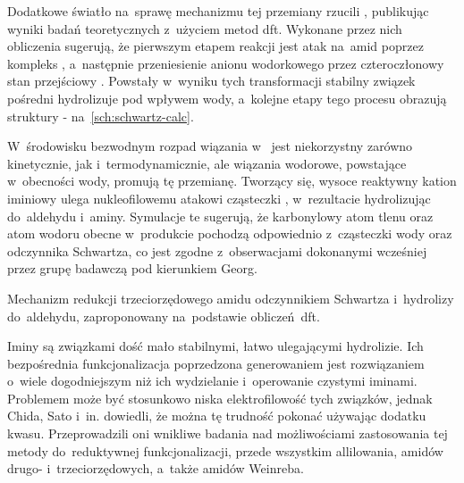 Dodatkowe światło na~sprawę mechanizmu tej przemiany rzucili \citeauthor{wang10}, publikując
  wyniki badań teoretycznych z~użyciem metod \gls{dft}.
Wykonane przez nich obliczenia sugerują, że pierwszym etapem reakcji jest atak \schwartz{}
  na~amid poprzez kompleks , a~następnie przeniesienie anionu wodorkowego
  przez czteroczłonowy stan przejściowy .
Powstały w~wyniku tych transformacji stabilny związek pośredni  hydrolizuje
  pod wpływem wody, a~kolejne etapy tego procesu obrazują struktury
  \-- na~\cref{sch:schwartz-calc}.

W~środowisku bezwodnym rozpad wiązania  w~ jest niekorzystny zarówno
  kinetycznie, jak i~termodynamicznie, ale wiązania wodorowe, powstające w~obecności wody,
  promują tę przemianę.
Tworzący się, wysoce reaktywny kation iminiowy  ulega nukleofilowemu atakowi
  cząsteczki , w~rezultacie hydrolizując do~aldehydu i~aminy.
Symulacje te sugerują, że karbonylowy atom tlenu oraz atom wodoru obecne w~produkcie pochodzą
  odpowiednio z~cząsteczki wody oraz odczynnika Schwartza, co jest zgodne z~obserwacjami dokonanymi
  wcześniej przez grupę badawczą pod kierunkiem Georg.
\begin{scheme*}
  
  \caption{
    Mechanizm redukcji trzeciorzędowego amidu odczynnikiem Schwartza i~hydrolizy do~aldehydu,
    zaproponowany na~podstawie obliczeń~\gls{dft}.
  }
  \label{sch:schwartz-calc}
\end{scheme*}

Iminy są związkami dość mało stabilnymi, łatwo ulegającymi hydrolizie.
Ich bezpośrednia funkcjonalizacja poprzedzona generowaniem \insitu{} jest rozwiązaniem
  o~wiele dogodniejszym niż ich wydzielanie i~operowanie czystymi iminami.
Problemem może być stosunkowo niska elektrofilowość tych związków, jednak Chida, Sato i~in.
  dowiedli, że można tę trudność pokonać używając dodatku kwasu.
Przeprowadzili oni wnikliwe badania nad możliwościami zastosowania tej metody do~reduktywnej
  funkcjonalizacji, przede wszystkim allilowania, amidów drugo- i~trzeciorzędowych,
  a~także amidów Weinreba.

